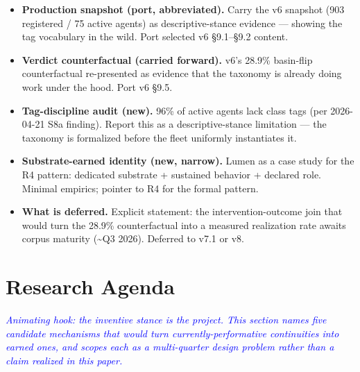 \documentclass[11pt,twocolumn]{article}
\newcommand{\outlinenote}[1]{\textcolor{blue}{\textit{#1}}}
\begin{document}
\begin{itemize}
  \item \textbf{Production snapshot (port, abbreviated).} Carry
        the v6 snapshot (903 registered / 75 active agents) as
        descriptive-stance evidence — showing the tag vocabulary
        in the wild. Port selected v6 §9.1--§9.2 content.
  \item \textbf{Verdict counterfactual (carried forward).} v6's
        28.9\% basin-flip counterfactual re-presented as evidence
        that the taxonomy is already doing work under the hood.
        Port v6 §9.5.
  \item \textbf{Tag-discipline audit (new).} 96\% of active
        agents lack class tags (per 2026-04-21 S8a finding).
        Report this as a descriptive-stance limitation — the
        taxonomy is formalized before the fleet uniformly
        instantiates it.
  \item \textbf{Substrate-earned identity (new, narrow).} Lumen
        as a case study for the R4 pattern: dedicated substrate
        + sustained behavior + declared role. Minimal empirics;
        pointer to R4 for the formal pattern.
  \item \textbf{What is deferred.} Explicit statement: the
        intervention-outcome join that would turn the 28.9\%
        counterfactual into a measured realization rate awaits
        corpus maturity (\textasciitilde Q3 2026). Deferred to
        v7.1 or v8.
\end{itemize}

\section{Research Agenda}
\outlinenote{Animating hook: the inventive stance is the project.
This section names five candidate mechanisms that would turn
currently-performative continuities into earned ones, and scopes
each as a multi-quarter design problem rather than a claim
realized in this paper.}
\end{document}
